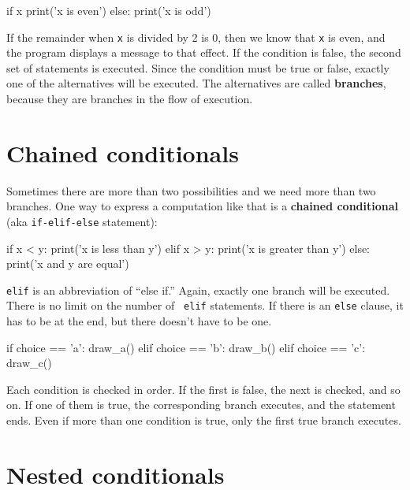 \beforeverb
\begin{pycode}
if x%
    print('x is even')
else:
    print('x is odd')
\end{pycode}
\afterverb
%
If the remainder when {\tt x} is divided by 2 is 0, then we
know that {\tt x} is even, and the program displays a message to that
effect.  If the condition is false, the second set of statements is
executed.  Since the condition must be true or false, exactly one of
the alternatives will be executed.  The alternatives are called
{\bf branches}, because they are branches in the flow of execution.




\section{Chained conditionals}

Sometimes there are more than two possibilities and we need more than
two branches.  One way to express a computation like that is a {\bf
chained conditional} (aka {\tt if-elif-else} statement):

\beforeverb
\begin{pycode}
if x < y:
    print('x is less than y')
elif x > y:
    print('x is greater than y')
else:
    print('x and y are equal')
\end{pycode}
\afterverb
%
{\tt elif} is an abbreviation of ``else if.''  Again, exactly one
branch will be executed.  There is no limit on the number of {\tt
elif} statements.  If there is an {\tt else} clause, it has to be
at the end, but there doesn't have to be one.



\beforeverb
\begin{pycode}
if choice == 'a':
    draw_a()
elif choice == 'b':
    draw_b()
elif choice == 'c':
    draw_c()
\end{pycode}
\afterverb
%
Each condition is checked in order.  If the first is false,
the next is checked, and so on.  If one of them is
true, the corresponding branch executes, and the statement
ends.  Even if more than one condition is true, only the
first true branch executes.  


\section{Nested conditionals}


